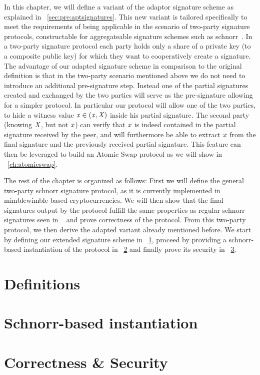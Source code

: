 In this chapter, we will define a variant of the adaptor signature scheme as explained in ~\cref{sec:pre:aptsignatures}.
This new variant is tailored specifically to meet the requirements of being applicable in the scenario of two-party signature protocols, constructable for aggregateable signature schemes such as schnorr~\cite{maxwell2019simple}.
In a two-party signature protocol each party holds only a share of a private key (to a composite public key) for which they want to cooperatively create a signature.
The advantage of our adapted signature scheme in comparison to the original definition is that in the two-party scenario mentioned above we do not need to introduce an additional pre-signature step.
Instead one of the partial signatures created and exchanged by the two parties will serve as the pre-signature allowing for a simpler protocol.
In particular our protocol will allow one of the two parties, to hide a witness value $\mathit{x} \in (\mathit{x}, \mathit{X})$ inside his partial signature.
The second party (knowing $\mathit{X}$, but not $\mathit{x}$) can verify that $\mathit{x}$ is indeed contained in the partial signature received by the peer, and will furthermore be able to extract $\mathit{x}$ from the final signature and the previously received partial signature.
This feature can then be leveraged to build an Atomic Swap protocol as we will show in ~\cref{ch:atomicswap}.

The rest of the chapter is organized as follows:
First we will define the general two-party schnorr signature protocol, as it is currently implemented in mimblewimble-based cryptocurrencies.
We will then show that the final signatures output by the protocol fulfill the same properties as regular schnorr signatures seen in ~\cite{schnorr1989efficient} and prove correctness of the protocol.
From this two-party protocol, we then derive the adapted variant already mentioned before.
We start by defining our extended signature scheme in ~\cref{sec:sig:definitions}, proceed by providing a schnorr-based instantiation of the protocol in ~\cref{sec:sig:schnorr-inst} and finally prove its security in ~\cref{sec:sig:two-party-apt-security}.

\section{Definitions} \label{sec:sig:definitions}


\section{Schnorr-based instantiation} \label{sec:sig:schnorr-inst}


\section{Correctness \& Security}\label{sec:sig:two-party-apt-security}

